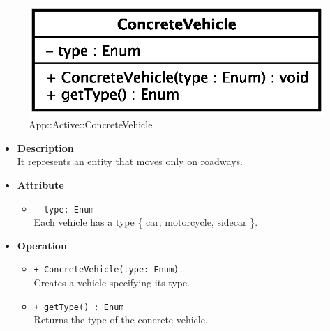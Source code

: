 \begin{figure}[h]
\centering
\includegraphics[scale=0.6,keepaspectratio]{images/solution/concrete_vehicle.eps}
\caption{App::Active::ConcreteVehicle}
\label{fig:sd-app-concrete-vehicle}
\end{figure}
\FloatBarrier
\begin{itemize}
  \item \textbf{Description} \\
It represents an entity that moves only on roadways.
  \item \textbf{Attribute}
  \begin{itemize}
    \item \texttt{- type: Enum} \\
Each vehicle has a type \{ car, motorcycle, sidecar \}.
  \end{itemize}
  \item \textbf{Operation}
  \begin{itemize} 
    \item \texttt{+ ConcreteVehicle(type: Enum)} \\
Creates a vehicle specifying its type.
    \item \texttt{+ getType() : Enum} \\
Returns the type of the concrete vehicle.
  \end{itemize}
\end{itemize} 
